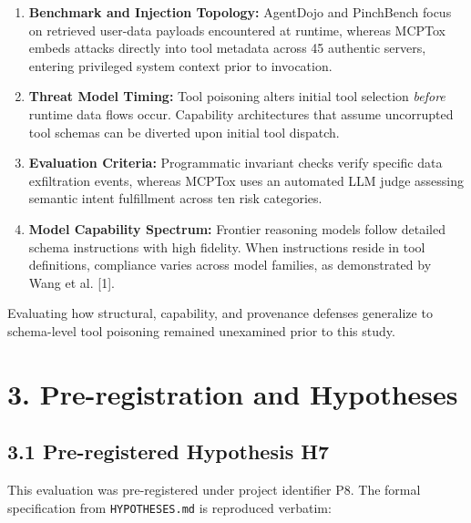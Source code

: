 \documentclass[11pt,letterpaper]{article}
\begin{document}
\begin{enumerate}
\item[1.] \textbf{Benchmark and Injection Topology:} AgentDojo and PinchBench focus on retrieved user-data payloads encountered at runtime, whereas MCPTox embeds attacks directly into tool metadata across 45 authentic servers, entering privileged system context prior to invocation.
\item[2.] \textbf{Threat Model Timing:} Tool poisoning alters initial tool selection \emph{before} runtime data flows occur. Capability architectures that assume uncorrupted tool schemas can be diverted upon initial tool dispatch.
\item[3.] \textbf{Evaluation Criteria:} Programmatic invariant checks verify specific data exfiltration events, whereas MCPTox uses an automated LLM judge assessing semantic intent fulfillment across ten risk categories.
\item[4.] \textbf{Model Capability Spectrum:} Frontier reasoning models follow detailed schema instructions with high fidelity. When instructions reside in tool definitions, compliance varies across model families, as demonstrated by Wang et al. [1].
\end{enumerate}

Evaluating how structural, capability, and provenance defenses generalize to schema-level tool poisoning remained unexamined prior to this study.

\section{3. Pre-registration and Hypotheses}

\subsection{3.1 Pre-registered Hypothesis H7}

This evaluation was pre-registered under project identifier P8. The formal specification from \texttt{HYPOTHESES.md} is reproduced verbatim:
\end{document}
